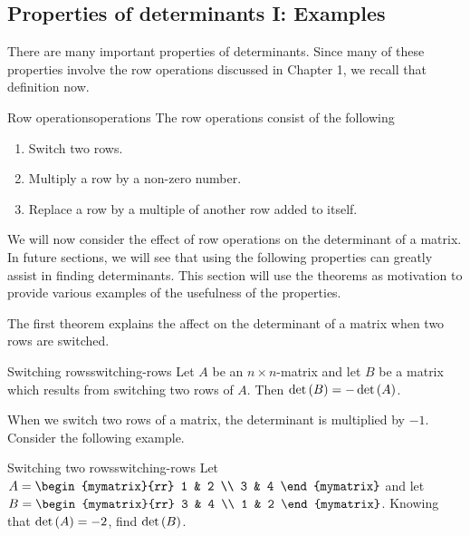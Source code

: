 \subsection{Properties of determinants I: Examples}

There are many important properties of determinants. Since many of these properties involve
the row operations discussed in Chapter 1, we recall that definition now. 

\begin{definition}{Row operations}{operations}
The row operations
consist of the following

\begin{enumerate}
\item Switch two rows.

\item Multiply a row by a non-zero number.

\item Replace a row by a multiple of another row added to itself.
\end{enumerate}
\end{definition}

We will now consider the effect of row operations on the determinant of a matrix. In future sections, we will see that using the following properties can 
greatly assist in finding determinants. This section will use the theorems as motivation to provide various examples of the usefulness of the properties. 

The first theorem explains the affect on the determinant of a matrix when two rows are switched. 

\begin{theorem}{Switching rows}{switching-rows}
Let $A$ be an $n\times n$-matrix and let $B$ be a matrix
which results from switching two rows of $A$. Then $\det \left(B\right)
= - \det \left(A\right)$. 
\end{theorem}

When we switch two rows of a matrix, the determinant is multiplied by $-1$. Consider the following example.

\begin{example}{Switching two rows}{switching-rows}
Let $A=\begin{mymatrix}{rr}
1 & 2 \\
3 & 4
\end{mymatrix} $ and let $B=\begin{mymatrix}{rr}
3 & 4 \\
1 & 2
\end{mymatrix}$. 
Knowing that $\det \left(A \right) =-2$, find $\det \left(B \right)$.
\end{example}


